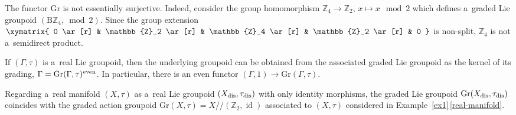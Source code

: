 \documentclass[10pt,a4paper]{amsart}
\numberwithin{equation}{section}
\def\Z {\mathbb{Z}}
\def\act#1#2{#1/\!\!/#2}
\newcommand{\id}{\operatorname{id}}
\def\Gr{\mathrm{Gr}}
\begin{document}
\begin{Remark}
 The functor $\Gr$ is not essentially surjective. Indeed, consider the group homomorphism $\Z_4 \to \Z_2$, $x \mapsto x \mod 2$ which defines a~graded Lie groupoid
 $(\mathrm{B}\Z_4,\bmod 2)$. Since the group extension
$
 \xymatrix{
 0 \ar[r] & \Z_2 \ar[r] & \Z_4 \ar[r] & \Z_2 \ar[r] & 0
 }
$
 is non-split, $\Z_4$ is not a~semidirect product.
\end{Remark}

\begin{Remark}
\label{graded-groupoid-functor-inclusion}
If $(\Gamma,\tau)$ is a~real Lie groupoid, then the underlying groupoid can be obtained from the associated graded Lie groupoid as the kernel of its grading,
$
\Gamma = \Gr(\Gamma,\tau)^{\rm even}$.
In particular, there is an even functor $(\Gamma,1) \to \Gr(\Gamma,\tau)$.
\end{Remark}

\begin{Remark}
 Regarding a~real manifold $(X,\tau)$ as a~real Lie groupoid $(X_{\rm dis},\tau_{\rm dis})$ with only identity morphisms, the graded Lie groupoid $\Gr(X_{\rm dis},\tau_{\rm dis})$ coincides with the graded action groupoid $\mathrm{Gr}(X,\tau) =\act X{(\Z_2,\id)}$ associated to $(X,\tau)$ considered in Example~\ref{ex1}\,\ref{real-manifold}.
\end{Remark}
\end{document}
